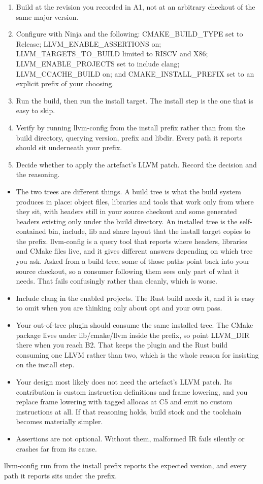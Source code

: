 \documentclass[11pt,a4paper]{article}
\newcommand{\lbl}[1]{\vspace{5pt}\noindent{\scriptsize\bfseries\color{mute}\MakeUppercase{#1}}\par\vspace{1pt}}
\begin{document}
\lbl{Method}
\begin{enumerate}
  \item Build at the revision you recorded in A1, not at an arbitrary checkout of the same major version.
  \item Configure with Ninja and the following: CMAKE\_BUILD\_TYPE set to Release; LLVM\_ENABLE\_ASSERTIONS on; LLVM\_TARGETS\_TO\_BUILD limited to RISCV and X86; LLVM\_ENABLE\_PROJECTS set to include clang; LLVM\_CCACHE\_BUILD on; and CMAKE\_INSTALL\_PREFIX set to an explicit prefix of your choosing.
  \item Run the build, then run the install target. The install step is the one that is easy to skip.
  \item Verify by running llvm-config from the install prefix rather than from the build directory, querying version, prefix and libdir. Every path it reports should sit underneath your prefix.
  \item Decide whether to apply the artefact's LLVM patch. Record the decision and the reasoning.
\end{enumerate}
\lbl{Watch out for}
\begin{itemize}
  \item The two trees are different things. A build tree is what the build system produces in place: object files, libraries and tools that work only from where they sit, with headers still in your source checkout and some generated headers existing only under the build directory. An installed tree is the self-contained bin, include, lib and share layout that the install target copies to the prefix. llvm-config is a query tool that reports where headers, libraries and CMake files live, and it gives different answers depending on which tree you ask. Asked from a build tree, some of those paths point back into your source checkout, so a consumer following them sees only part of what it needs. That fails confusingly rather than cleanly, which is worse.
  \item Include clang in the enabled projects. The Rust build needs it, and it is easy to omit when you are thinking only about opt and your own pass.
  \item Your out-of-tree plugin should consume the same installed tree. The CMake package lives under lib/cmake/llvm inside the prefix, so point LLVM\_DIR there when you reach B2. That keeps the plugin and the Rust build consuming one LLVM rather than two, which is the whole reason for insisting on the install step.
  \item Your design most likely does not need the artefact's LLVM patch. Its contribution is custom instruction definitions and frame lowering, and you replace frame lowering with tagged allocas at C5 and emit no custom instructions at all. If that reasoning holds, build stock and the toolchain becomes materially simpler.
  \item Assertions are not optional. Without them, malformed IR fails silently or crashes far from its cause.
\end{itemize}
\lbl{Done when}
llvm-config run from the install prefix reports the expected version, and every path it reports sits under the prefix.
\end{document}
